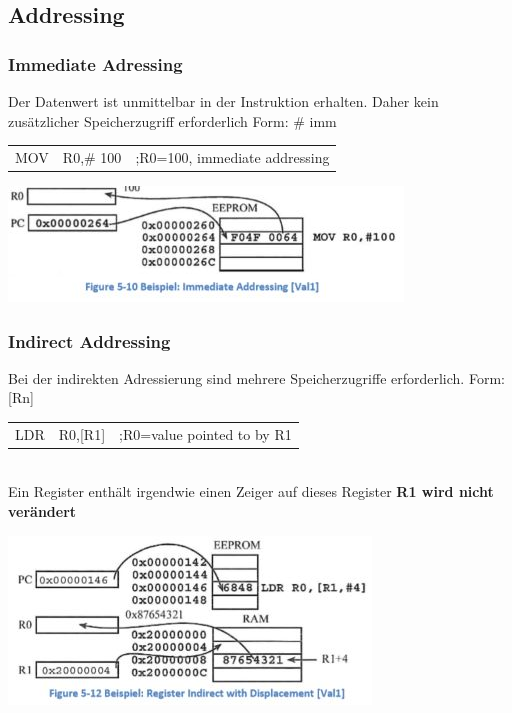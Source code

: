 \subsection{Addressing}
\begin{multicols}{2}
    \begin{minipage}{\linewidth}
        \subsubsection{Immediate Adressing}
        Der Datenwert ist unmittelbar in der Instruktion erhalten. Daher kein zusätzlicher Speicherzugriff erforderlich\newline
        Form: \# imm\newline
        \begin{tabular}{lll}
             MOV & R0,\# 100&;R0=100, immediate addressing \\ 
        \end{tabular} 
    \end{minipage}
    \includegraphics[width=0.9\linewidth]{images/immediateAddressing}    
\end{multicols}   

\begin{multicols}{2}
    \begin{minipage}{\linewidth}
        \subsubsection{Indirect Addressing}
        Bei der indirekten Adressierung sind mehrere Speicherzugriffe erforderlich.\newline
        Form: [Rn]\newline
        \begin{tabular}{lll}
            LDR & R0,[R1]&;R0=value pointed to by R1 \\ 
        \end{tabular} \\
        Ein Register enthält irgendwie einen Zeiger auf dieses Register\newline
        \textbf{R1 wird nicht verändert}
    \end{minipage}
     \includegraphics[width=0.9\linewidth]{images/indirectAddressing}    
\end{multicols} 

